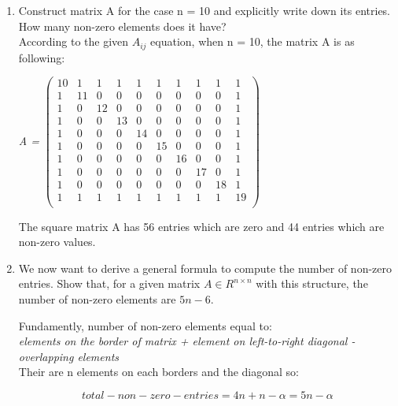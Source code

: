 \documentclass[unicode,11pt,a4paper,oneside,numbers=endperiod,openany]{scrartcl}
\begin{document}
\begin{enumerate}
 \item {Construct matrix A for the case n = 10 and explicitly write down its entries. How many non-zero elements does it have?} \\
 {According to the given $A_{ij}$ equation, when n = 10, the matrix A is as following:}
 \begin{center}
{ \textit{A =}
$\begin{pmatrix}
 10 & 1 & 1 & 1 & 1 & 1 & 1 & 1 & 1 & 1 \\
 1 & 11 & 0 & 0 & 0 & 0 & 0 & 0 & 0 & 1 \\
 1 & 0 & 12 & 0 & 0 & 0 & 0 & 0 & 0 & 1 \\
 1 & 0 & 0 & 13 & 0 & 0 & 0 & 0 & 0 & 1\\
 1 & 0 & 0 & 0 & 14 & 0 & 0 & 0 & 0 & 1 \\
 1 & 0 & 0 & 0 & 0 & 15 & 0 & 0 & 0 & 1 \\
 1 & 0 & 0 & 0 & 0 & 0 & 16 & 0 & 0 & 1 \\
 1 & 0 & 0 & 0 & 0 & 0 & 0 & 17 & 0 & 1 \\
 1 & 0 & 0 & 0 & 0 & 0 & 0 & 0 & 18 & 1 \\
 1 & 1 & 1 & 1 & 1 & 1 & 1 & 1 & 1 & 19 \\
\end{pmatrix}$
}
\end{center}
{The square matrix A has 56 entries which are zero and 44 entries which are non-zero values. }\\

\item {We now want to derive a general formula to compute the number of non-zero entries. Show that, for a given matrix $A \in R^{n \times n}$ with this structure, the number of non-zero elements are $5n - 6$.}

{Fundamently, number of non-zero elements equal to: \\

\textit{elements on the border of matrix + element on left-to-right diagonal - overlapping elements} \\

Their are n elements on each borders and the diagonal so:}\\
\begin{center}
\begin{equation}
 total-non-zero-entries = 4n + n - \alpha = 5n - \alpha
\end{equation}
\end{center}


\end{enumerate}
\end{document}
